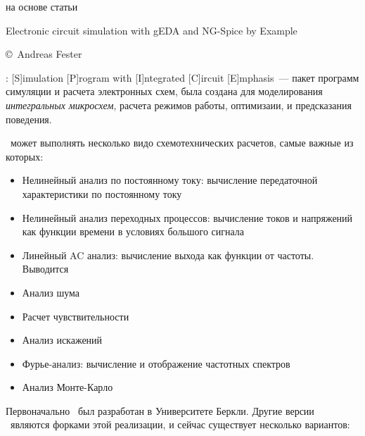 \label{spice}\secdown

на основе статьи



Electronic circuit simulation with gEDA and NG-Spice by Example

\copyright\ Andreas Fester

\bigskip

\prog{\spice}: [S]imulation [P]rogram with [I]ntegrated [C]ircuit
[E]mphasis\ --- пакет программ симуляции и расчета электронных схем,
была создана для моделирования \emph{интегральных микросхем}, расчета режимов
работы, оптимизаии, и предсказания поведения.

\bigskip
\spice\ может выполнять несколько видо схемотехнических расчетов, самые важные
из которых:

\begin{itemize}
  \item
Нелинейный анализ по постоянному току: вычисление передаточной характеристики по
постоянному току
  \item
Нелинейный анализ переходных процессов: вычисление токов и напряжений как
функции времени в условиях большого сигнала
  \item
Линейный AC анализ: вычисление выхода как функции от частоты. Выводится
  \item
Анализ шума
  \item
Расчет чувствительности
  \item
Анализ искажений
  \item
Фурье-анализ: вычисление и отображение частотных спектров
  \item
Анализ Монте-Карло
\end{itemize}

\bigskip

\secdown

Первоначально \spice\ был разработан в Университете Беркли. Другие версии
\spice\ являются форками этой реализации, и сейчас существует несколько
вариантов:

